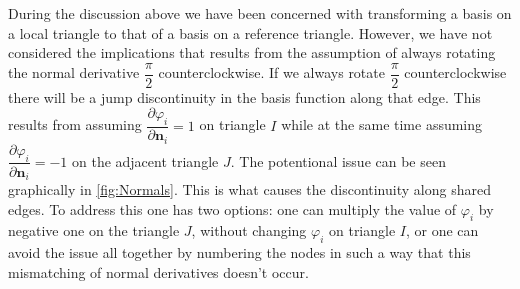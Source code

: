 During the discussion above we have been concerned with transforming a basis on
a local triangle to that of a basis on a reference triangle. However, we have
not considered the implications that results from the assumption of always
rotating the normal derivative $\dfrac{\pi}{2}$ counterclockwise.  If we always
rotate $\dfrac{\pi}{2}$ counterclockwise there will be a jump discontinuity in
the basis function along that edge.  This results from assuming
$\dfrac{\partial\varphi_i}{\partial\mathbf{n}_i} = 1$ on triangle $I$ while at
the same time assuming $\dfrac{\partial\varphi_i}{\partial\mathbf{n}_i} = -1$ on
the adjacent triangle $J$. The potentional issue can be seen graphically in
\autoref{fig:Normals}. This is what causes the discontinuity along shared edges.
To address this one has two options: one can multiply the value of $\varphi_i$ by
negative one on the triangle $J$, without changing $\varphi_i$ on triangle
$I$, or one can avoid the issue all together by numbering the nodes in such a way
that this mismatching of normal derivatives doesn't occur.




